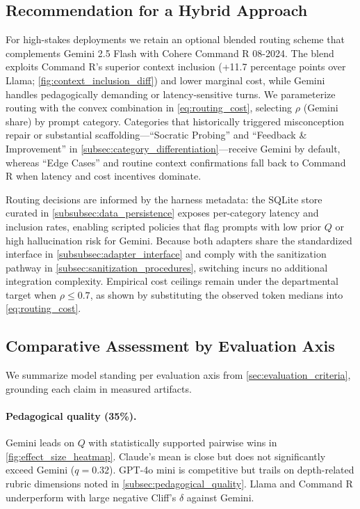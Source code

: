 \subsection{Recommendation for a Hybrid Approach}
\label{subsec:hybrid_approach}

For high-stakes deployments we retain an optional blended routing scheme that complements Gemini 2.5 Flash with Cohere Command R 08-2024. The blend exploits Command R's superior context inclusion (+11.7 percentage points over Llama; \cref{fig:context_inclusion_diff}) and lower marginal cost, while Gemini handles pedagogically demanding or latency-sensitive turns. We parameterize routing with the convex combination in \cref{eq:routing_cost}, selecting $\rho$ (Gemini share) by prompt category. Categories that historically triggered misconception repair or substantial scaffolding---``Socratic Probing'' and ``Feedback \& Improvement'' in \cref{subsec:category_differentiation}---receive Gemini by default, whereas ``Edge Cases'' and routine context confirmations fall back to Command R when latency and cost incentives dominate.

Routing decisions are informed by the harness metadata: the SQLite store curated in \cref{subsubsec:data_persistence} exposes per-category latency and inclusion rates, enabling scripted policies that flag prompts with low prior $Q$ or high hallucination risk for Gemini. Because both adapters share the standardized interface in \cref{subsubsec:adapter_interface} and comply with the sanitization pathway in \cref{subsec:sanitization_procedures}, switching incurs no additional integration complexity. Empirical cost ceilings remain under the departmental target when $\rho\leq0.7$, as shown by substituting the observed token medians into \cref{eq:routing_cost}.

\subsection{Comparative Assessment by Evaluation Axis}
\label{subsec:axis_assessment}

We summarize model standing per evaluation axis from \cref{sec:evaluation_criteria}, grounding each claim in measured artifacts.

\paragraph{Pedagogical quality (35\%).} Gemini leads on $Q$ with statistically supported pairwise wins in \cref{fig:effect_size_heatmap}. Claude's mean is close but does not significantly exceed Gemini ($q=0.32$). GPT-4o mini is competitive but trails on depth-related rubric dimensions noted in \cref{subsec:pedagogical_quality}. Llama and Command R underperform with large negative Cliff's $\delta$ against Gemini.

